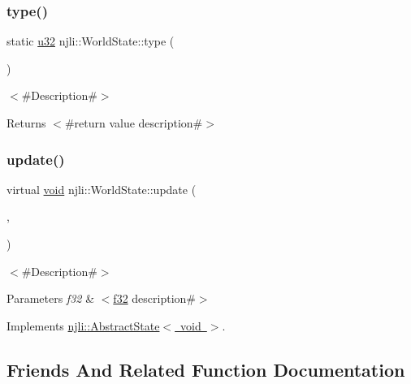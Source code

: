 \subsubsection{\texorpdfstring{type()}{type()}}
{\footnotesize\ttfamily static \mbox{\hyperlink{_util_8h_a10e94b422ef0c20dcdec20d31a1f5049}{u32}} njli\+::\+World\+State\+::type (\begin{DoxyParamCaption}{ }\end{DoxyParamCaption})\hspace{0.3cm}{\ttfamily [static]}}

$<$\#\+Description\#$>$

\begin{DoxyReturn}{Returns}
$<$\#return value description\#$>$ 
\end{DoxyReturn}
\mbox{\label{classnjli_1_1_world_state_a7390c8af937d9be5f95e33e300321171}} 
\subsubsection{\texorpdfstring{update()}{update()}}
{\footnotesize\ttfamily virtual \mbox{\hyperlink{_thread_8h_af1e856da2e658414cb2456cb6f7ebc66}{void}} njli\+::\+World\+State\+::update (\begin{DoxyParamCaption}\item[{\mbox{\hyperlink{_thread_8h_af1e856da2e658414cb2456cb6f7ebc66}{void}} $\ast$}]{,  }\item[{\mbox{\hyperlink{_util_8h_a5f6906312a689f27d70e9d086649d3fd}{f32}}}]{ }\end{DoxyParamCaption})\hspace{0.3cm}{\ttfamily [virtual]}}

$<$\#\+Description\#$>$


\begin{DoxyParams}{Parameters}
{\em f32} & $<$\mbox{\hyperlink{_util_8h_a5f6906312a689f27d70e9d086649d3fd}{f32}} description\#$>$ \\
\hline
\end{DoxyParams}


Implements \mbox{\hyperlink{classnjli_1_1_abstract_state_aa1d0341a1b1bd83f9b722488680537ad}{njli\+::\+Abstract\+State$<$ void $>$}}.



\subsection{Friends And Related Function Documentation}
\mbox{\label{classnjli_1_1_world_state_acb96ebb09abe8f2a37a915a842babfac}} 

